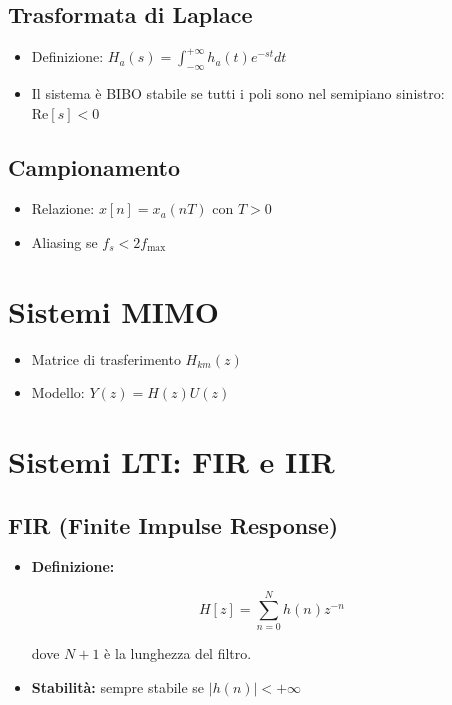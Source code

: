 \subsection*{Trasformata di Laplace}
\begin{itemize}
    \item Definizione: $H_a(s)=\int_{-\infty}^{+\infty} h_a(t)e^{-st} dt$
    \item Il sistema è BIBO stabile se tutti i poli sono nel semipiano sinistro: $\text{Re}[s] < 0$
\end{itemize}

\subsection*{Campionamento}

\begin{itemize}
    \item Relazione: $x[n] = x_a(nT)$ con $T>0$
    \item Aliasing se $f_s < 2f_{\text{max}}$
\end{itemize}

\section{Sistemi MIMO}

\begin{itemize}
    \item Matrice di trasferimento $H_{km}(z)$
    \item Modello: $Y(z) = H(z)U(z)$
\end{itemize}

\section{Sistemi LTI: FIR e IIR}

\subsection*{FIR (Finite Impulse Response)}

\begin{itemize}
    \item \textbf{Definizione:}
    
    \[
    H[z] = \sum_{n=0}^{N} h(n) z^{-n}
    \]
    
    dove $N+1$ è la lunghezza del filtro.
    
    \item \textbf{Stabilità:} sempre stabile se $|h(n)| < +\infty$
\end{itemize}

